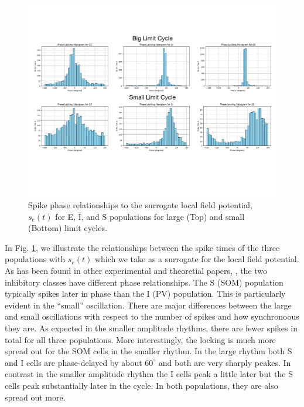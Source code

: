 \documentclass[10pt,letterpaper]{article}
\begin{document}
\begin{figure}
  \includegraphics[width=.8\textwidth]{afig2.pdf}
  \caption{Spike phase relationships to the surrogate local field potential, $s_e(t)$ for E, I, and S populations for large (Top) and small (Bottom) limit cycles.}
  \label{fig:1b}
\end{figure}


In Fig. \ref{fig:1b}, we illustrate the relationships between the spike times of the three populations with $s_e(t)$ which we take as a surrogate for the local field potential. As has been found in other experimental and theoretial papers, \cite{chen2017somatostatin,FMM}, the two inhibitory classes have different phase relationships.  The S (SOM) population typically spikes later in phase than the I (PV) population. This is particularly evident in the ``small'' oscillation.  There are major differences between the large and small oscillations with respect to the number of spikes and how synchronoous they are.  As expected in the smaller amplitude rhythms, there are fewer spikes in total for all three populations.  More interestingly, the locking is much more spread out for the SOM cells in the smaller rhythm. In the large rhythm both S and I cells are phase-delayed by about $60^\circ$ and both are very sharply peakes. In contrast in the smaller amplitude rhythm the I cells peak a little later but the S cells peak substantially later in the cycle.  In both populations, they are also spread out more. 
\end{document}
